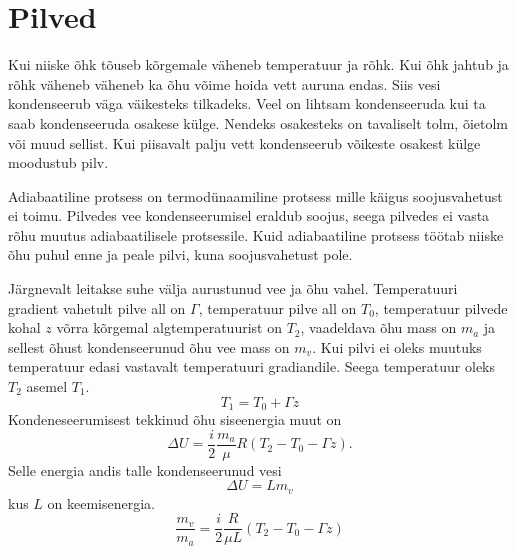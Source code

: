 \documentclass{trkut}%
\begin{document}
\section{Pilved}
Kui niiske õhk tõuseb kõrgemale väheneb temperatuur ja rõhk. Kui õhk jahtub ja rõhk väheneb väheneb ka õhu võime hoida vett auruna endas. Siis vesi kondenseerub väga väikesteks tilkadeks. Veel on lihtsam kondenseeruda kui ta saab kondenseeruda osakese külge. Nendeks osakesteks on tavaliselt tolm, õietolm või muud sellist. Kui piisavalt palju vett kondenseerub võikeste osakest külge moodustub pilv.

Adiabaatiline protsess on termodünaamiline protsess mille käigus soojusvahetust ei toimu. Pilvedes vee kondenseerumisel eraldub soojus, seega pilvedes ei vasta rõhu muutus adiabaatilisele protsessile. Kuid adiabaatiline protsess töötab niiske õhu puhul enne ja peale pilvi, kuna soojusvahetust pole.

Järgnevalt leitakse suhe välja aurustunud vee ja õhu vahel. Temperatuuri gradient vahetult pilve all on $\Gamma$, temperatuur pilve all on $T_0$, temperatuur pilvede kohal $z$ võrra kõrgemal algtemperatuurist on $T_2$, vaadeldava õhu mass on $m_a$ ja sellest õhust kondenseerunud õhu vee mass on $m_v$. Kui pilvi ei oleks muutuks temperatuur edasi vastavalt temperatuuri gradiandile. Seega temperatuur oleks $T_2$ asemel $T_1$.
\begin{equation*}
T_1 = T_0 + \Gamma z
\end{equation*}
Kondeneseerumisest tekkinud õhu siseenergia muut on
\begin{equation*}
\Delta U = \frac{i}{2}\frac{m_a}{\mu}R\left(T_2 - T_0 - \Gamma z\right).
\end{equation*}
Selle energia andis talle kondenseerunud vesi
\begin{equation*}
\Delta U = L m_v
\end{equation*}
kus $L$ on keemisenergia.
\begin{equation*}
\frac{m_v}{m_a} = \frac{i}{2}\frac{R}{\mu L}\left(T_2- T_0 - \Gamma z\right)
\end{equation*}
\end{document}
